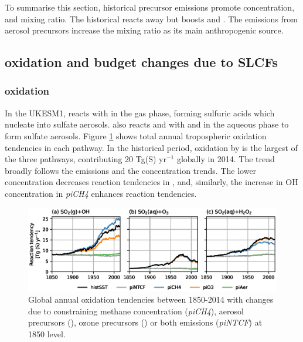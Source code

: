 To summarise this section, historical  precursor emissions promote  concentration,  and  mixing ratio. The historical  reacts away  but boosts  and . The  emissions from aerosol precursors increase the  mixing ratio as its main anthropogenic source.

\subsection{\texorpdfstring{}{SO2} oxidation and budget changes due to SLCFs}

\subsubsection{\textsoo{} oxidation}
\label{sec:ch3:oxidation}


In the UKESM1,  reacts with  in the gas phase, forming sulfuric acids which nucleate into sulfate aerosols.  also reacts and with  and  in the aqueous phase to form sulfate aerosols. Figure \ref{fig:ch3:oxidation} shows total annual tropospheric  oxidation tendencies in each pathway. In the historical period,  oxidation by  is the largest of the three pathways, contributing 20 Tg(S) yr$^{-1}$ globally in 2014. The  trend broadly follows the  emissions and the  concentration trends. The lower  concentration decreases  reaction tendencies in \sstpio{}, and, similarly, the increase in OH concentration in \textit{piCH4} enhances  reaction tendencies.

\begin{figure}
    \centering
    \includegraphics[width=\linewidth]{Chapter3/Figs/f03_oxidation.eps}
    \caption[Global annual  oxidation tendencies]{Global annual  oxidation tendencies between 1850-2014 with changes due to constraining  methane concentration (\textit{piCH4}), aerosol precursors (\sstpiaer{}), ozone precursors (\sstpio{}) or both emissions (\textit{piNTCF}) at 1850 level.}
    \label{fig:ch3:oxidation}
\end{figure}


